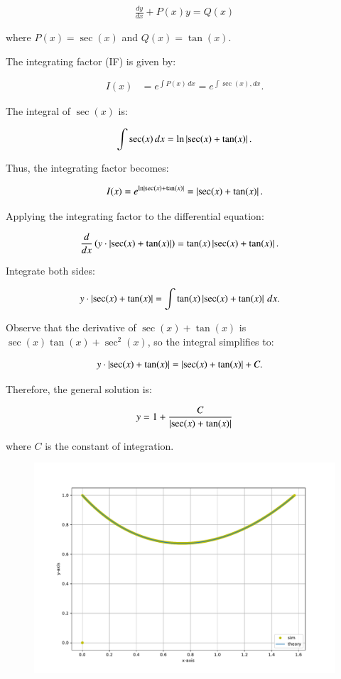\documentclass[journal]{IEEEtran}
\begin{document}
\begin{align*}
\frac{dy}{dx} + P(x)y = Q(x)
\end{align*}

where $P(x) = \sec(x)$ and $Q(x) = \tan(x)$.

The integrating factor (IF) is given by:

\begin{align*}
I(x) &= e^{\int P(x) \, dx} = e^{\int \sec (x), dx}.
\end{align*}

The integral of $\sec(x)$ is:

\begin{align*}
\int \sec(x) \, dx = \ln \left\vert\sec(x) + \tan(x)\right\vert.
\end{align*}

Thus, the integrating factor becomes:

\begin{align*}
I(x) = e^{\ln\left\vert\sec(x) + \tan(x)\right\vert} = \left\vert\sec(x) + \tan(x)\right\vert.
\end{align*}

Applying the integrating factor to the differential equation:

\begin{align*}
\frac{d}{dx}\left( y \cdot \left\vert\sec(x) + \tan(x)\right\vert\right) &= \tan(x) \left\vert\sec(x) + \tan(x)\right\vert.
\end{align*}

Integrate both sides:

\begin{align*}
y \cdot \left\vert\sec(x) + \tan(x)\right\vert &= \int \tan(x) \left\vert\sec(x) + \tan(x)\right\vert \, dx.
\end{align*}

Observe that the derivative of $\sec(x) + \tan(x)$ is $\sec(x)\tan(x) + \sec^2(x)$, so the integral simplifies to:

\begin{align*}
y \cdot \left\vert\sec(x) + \tan(x)\right\vert &= \left\vert\sec(x) + \tan(x)\right\vert + C.
\end{align*}

Therefore, the general solution is:

\begin{align*}
y = 1 + \frac{C}{\left\vert\sec(x) + \tan(x)\right\vert}
\end{align*}

where $C$ is the constant of integration.

\begin{figure}[h!]
   \centering
   \includegraphics[width=0.7\linewidth]{figs/combined_plot.pdf}
\end{figure}
\end{document}
